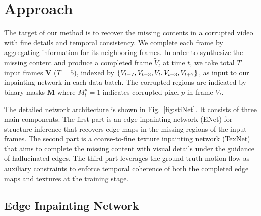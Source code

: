 

\section{Approach}\label{sec:approach}

The target of our method is to recover the missing contents in a corrupted video with fine details and temporal consistency.
%
We complete each frame by aggregating information for its neighboring frames. 
In order to synthesize the missing content and produce a completed frame $\widetilde{V}_t$ at time $t$, we take total $T$ input frames $\boldsymbol{V}$ ($T=5$), indexed by $\{V_{t-7},V_{t-3},V_{t},V_{t+3},V_{t+7}\}$, as input to our inpainting network in each data batch. 
%
The corrupted regions are indicated by binary masks $\boldsymbol{M}$ where $M_t^p=1$ indicates corrupted pixel $p$ in frame $V_t$. 
%

% 

The detailed network architecture is shown in 
Fig.~\ref{fig:stiNet}.
It consists of three main components. 
The first part is an edge inpainting network (ENet) for structure inference that recovers edge maps in the missing regions of the input frames.
The second part is a coarse-to-fine texture inpainting network (TexNet) that aims to complete the missing content with visual details under the guidance of hallucinated edges.
The third part leverages the ground truth motion flow as auxiliary constraints to enforce temporal coherence of both the completed edge maps and textures at the training stage.


\subsection{Edge Inpainting Network}
\label{sec:edgenet}

